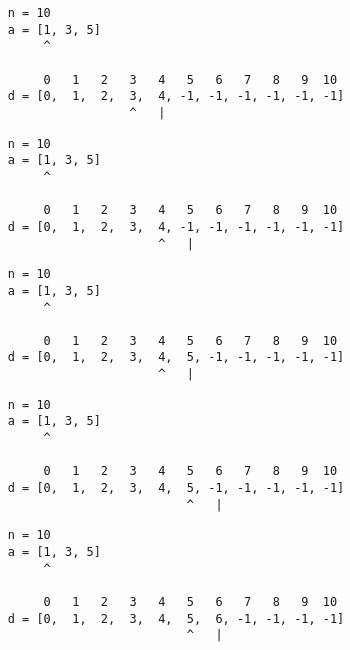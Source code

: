 \begin{frame}[fragile]
\begin{verbatim}
     n = 10
     a = [1, 3, 5]
          ^

          0   1   2   3   4   5   6   7   8   9  10
     d = [0,  1,  2,  3,  4, -1, -1, -1, -1, -1, -1]
                      ^   |
\end{verbatim}
\end{frame}
\addtocounter{framenumber}{-1}

\begin{frame}[fragile]
\begin{verbatim}
     n = 10
     a = [1, 3, 5]
          ^

          0   1   2   3   4   5   6   7   8   9  10
     d = [0,  1,  2,  3,  4, -1, -1, -1, -1, -1, -1]
                          ^   |
\end{verbatim}
\end{frame}
\addtocounter{framenumber}{-1}

\begin{frame}[fragile]
\begin{verbatim}
     n = 10
     a = [1, 3, 5]
          ^

          0   1   2   3   4   5   6   7   8   9  10
     d = [0,  1,  2,  3,  4,  5, -1, -1, -1, -1, -1]
                          ^   |
\end{verbatim}
\end{frame}
\addtocounter{framenumber}{-1}

\begin{frame}[fragile]
\begin{verbatim}
     n = 10
     a = [1, 3, 5]
          ^

          0   1   2   3   4   5   6   7   8   9  10
     d = [0,  1,  2,  3,  4,  5, -1, -1, -1, -1, -1]
                              ^   |
\end{verbatim}
\end{frame}
\addtocounter{framenumber}{-1}

\begin{frame}[fragile]
\begin{verbatim}
     n = 10
     a = [1, 3, 5]
          ^

          0   1   2   3   4   5   6   7   8   9  10
     d = [0,  1,  2,  3,  4,  5,  6, -1, -1, -1, -1]
                              ^   |
\end{verbatim}
\end{frame}
\addtocounter{framenumber}{-1}

